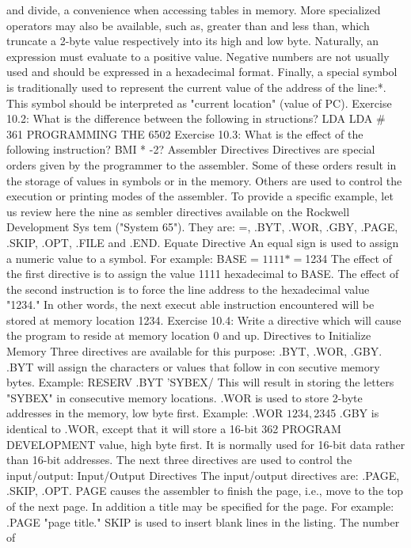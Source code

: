 {{{{{{{{{{{{{{{{{{{{{{{{{{{{{{{{{{{{{{{{{{{{{{{{{{{{{{{{{{{{{{{{{{{{{{{{{{{{{{{{{{{{{{{{{{{{{{{{{{{{{{{{{{{{{{{{{{{{{{{{{{{{{{{{{{{{{{{{{{{{and divide, a convenience when accessing tables in memory. More
specialized operators may also be available, such as, greater
than and less than, which truncate a 2-byte value respectively
into its high and low byte.
Naturally, an expression must evaluate to a positive value.
Negative numbers are not usually used and should be expressed in a
hexadecimal format.
Finally, a special symbol is traditionally used to represent the
current value of the address of the line:*. This symbol should be
interpreted as "current location" (value of PC).
Exercise 10.2: What is the difference between the following in
structions?
LDA%
LDA #%
361
PROGRAMMING THE 6502
Exercise 10.3: What is the effect of the following instruction?
BMI * -2?
Assembler Directives
Directives are special orders given by the programmer to the
assembler. Some of these orders result in the storage of values in
symbols or in the memory. Others are used to control the execution
or printing modes of the assembler.
To provide a specific example, let us review here the nine as
sembler directives available on the Rockwell Development Sys
tem ("System 65"). They are: =, .BYT, .WOR, .GBY, .PAGE,
.SKIP, .OPT, .FILE and .END.
Equate Directive
An equal sign is used to assign a numeric value to a symbol. For
example:
BASE = $1111
* = $1234
The effect of the first directive is to assign the value 1111
hexadecimal to BASE.
The effect of the second instruction is to force the line address to
the hexadecimal value "1234." In other words, the next execut
able instruction encountered will be stored at memory location
1234.
Exercise 10.4: Write a directive which will cause the program to
reside at memory location 0 and up.
Directives to Initialize Memory
Three directives are available for this purpose: .BYT, .WOR, .GBY.
.BYT will assign the characters or values that follow in con
secutive memory bytes.
Example: RESERV .BYT 'SYBEX/
This will result in storing the letters "SYBEX" in consecutive
memory locations.
.WOR is used to store 2-byte addresses in the memory, low byte
first.
Example: .WOR $1234, $2345
.GBY is identical to .WOR, except that it will store a 16-bit
362
PROGRAM DEVELOPMENT
value, high byte first. It is normally used for 16-bit data rather
than 16-bit addresses.
The next three directives are used to control the input/output:
Input/Output Directives
The input/output directives are: .PAGE, .SKIP, .OPT.
PAGE causes the assembler to finish the page, i.e., move to the
top of the next page. In addition a title may be specified for the
page. For example: .PAGE "page title."
SKIP is used to insert blank lines in the listing. The number of
}}}}}}}}}}}}}}}}}}}}}}}}}}}}}}}}}}}}}}}}}}}}}}}}}}}}}}}}}}}}}}}}}}}}}}}}}}}}}}}}}}}}}}}}}}}}}}}}}}}}}}}}}}}}}}}}}}}}}}}}}}}}}}}}}}}}}}}}}}}}
